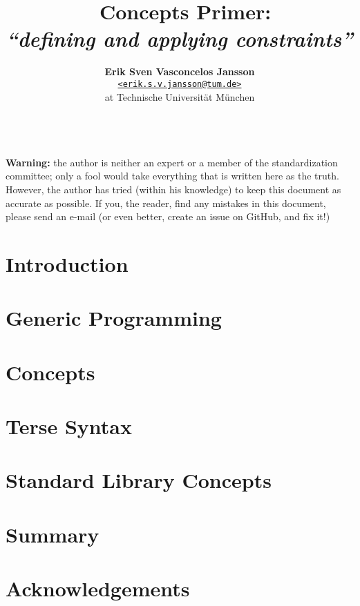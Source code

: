 \documentclass[a4paper, 11pt]{article}
\title{\vspace{-1.5em}\textbf{\Cpp\ Concepts Primer:}\\
       \large{\emph{``defining and applying constraints''}}}
\author{{\textbf{Erik Sven Vasconcelos Jansson}} \\
        {\href{mailto:erik.s.v.jansson@tum.de}
        {\texttt{<erik.s.v.jansson@tum.de>}}} \\
        {at Technische Universität München}}
\begin{document}
    \maketitle \begin{spacing}{0.94} \tableofcontents \end{spacing}

    \mbox{} \\ \noindent \textbf{Warning:} the author is neither an expert or a member of the standardization committee; only a fool would take everything that is written here as the truth. However, the author has tried (within his knowledge) to keep this document as accurate as possible. If you, the reader, find any mistakes in this document, please send an e-mail (or even better, create an issue on GitHub, and fix it!) \mbox{}  \thispagestyle{empty} \newpage {}

    \section{Introduction} \label{sec:introduction} 

    \newpage

    \section{Generic Programming} \label{sec:generic_programming} 

    \newpage

    \section{Concepts} \label{sec:concepts} 

    \newpage

    \section{Terse Syntax} \label{sec:terse_syntax} 

    \newpage

    \section{Standard Library Concepts} \label{sec:standard_library_concepts} 

    \newpage

    \section{Summary} \label{sec:summary} 

    \newpage
    \nocite{*} %
    
    

    \section*{Acknowledgements} \label{sec:acknowledgements} 
\end{document}

